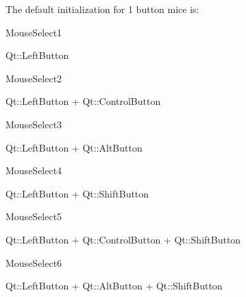 The default initialization for 1 button mice is\-:
\begin{DoxyItemize}
\item Mouse\-Select1\par
 Qt\-::\-Left\-Button
\item Mouse\-Select2\par
 Qt\-::\-Left\-Button + Qt\-::\-Control\-Button
\item Mouse\-Select3\par
 Qt\-::\-Left\-Button + Qt\-::\-Alt\-Button
\item Mouse\-Select4\par
 Qt\-::\-Left\-Button + Qt\-::\-Shift\-Button
\item Mouse\-Select5\par
 Qt\-::\-Left\-Button + Qt\-::\-Control\-Button + Qt\-::\-Shift\-Button
\item Mouse\-Select6\par
 Qt\-::\-Left\-Button + Qt\-::\-Alt\-Button + Qt\-::\-Shift\-Button
\end{DoxyItemize}

